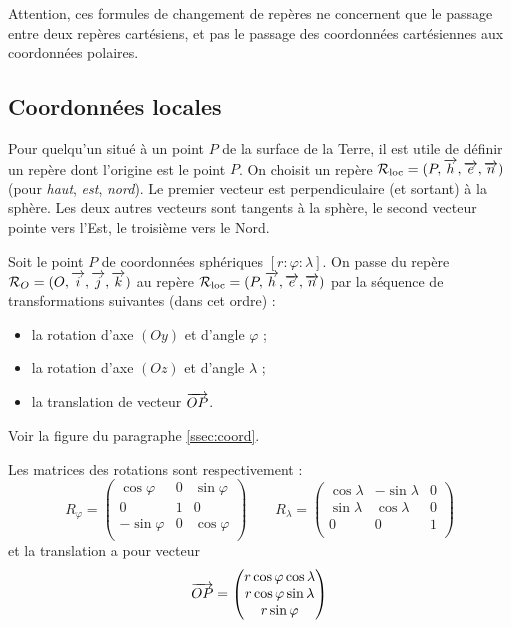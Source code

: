 \documentclass[class=report,crop=false]{standalone}
\begin{document}
\bigskip

Attention, ces formules de changement de repères ne concernent que 
le passage entre deux repères cartésiens, et pas le passage des coordonnées 
cartésiennes aux coordonnées polaires. 


\subsection{Coordonnées locales}

Pour quelqu'un situé à un point $P$ de la surface de la Terre, il est utile
de définir un repère dont l'origine est le point $P$. On choisit un repère
$\mathcal{R}_{\text{loc}} = (P,\overrightarrow{h},\overrightarrow{e},\overrightarrow{n})$ (pour \emph{haut}, \emph{est}, \emph{nord}).
Le premier vecteur est perpendiculaire (et sortant) à la sphère.
Les deux autres vecteurs sont tangents à la sphère, 
le second vecteur pointe vers l'Est, le troisième vers le Nord.




Soit le point $P$ de coordonnées sphériques $[r :\varphi :\lambda]$.
On passe du repère $\mathcal{R}_O = (O,\overrightarrow{i},\overrightarrow{j},\overrightarrow{k})$ au repère
$\mathcal{R}_{\text{loc}} = (P,\overrightarrow{h},\overrightarrow{e},\overrightarrow{n})$ par 
la séquence de transformations suivantes (dans cet ordre) :
\begin{itemize}
  \item la rotation d'axe $(Oy)$ et d'angle $\varphi$ ;
  \item la rotation d'axe $(Oz)$ et d'angle $\lambda$ ;
  \item la translation de vecteur $\overrightarrow{OP}$.
\end{itemize}

Voir la figure du paragraphe \ref{ssec:coord}.


Les matrices des rotations sont respectivement :
$$R_\varphi = 
\begin{pmatrix}
\cos \varphi & 0 & \sin \varphi \\
0            & 1 & 0 \\
-\sin \varphi & 0 & \cos \varphi \\
\end{pmatrix}
\qquad R_\lambda = 
\begin{pmatrix}
\cos \lambda & -\sin \lambda & 0 \\
\sin \lambda & \cos \lambda  & 0 \\
0            & 0             & 1 \\
\end{pmatrix}$$
et la translation a pour vecteur 
$$\overrightarrow{OP} = 
\begin{pmatrix}
r \cos \varphi \cos \lambda \\
r \cos \varphi \sin \lambda \\
r \sin \varphi  
\end{pmatrix}$$
\end{document}
